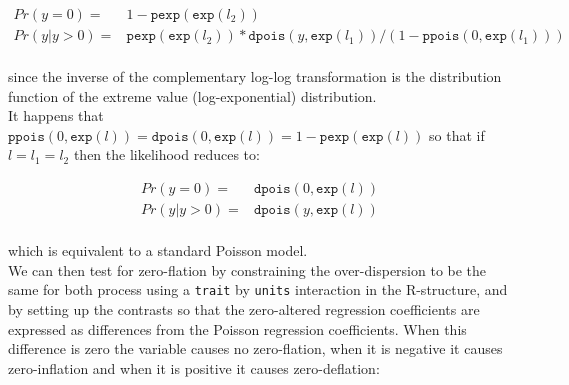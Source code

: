 \documentclass{article}
\begin{document}
\begin{equation} 
\begin{array}{rl}
Pr(y=0) =& 1-\texttt{pexp}(\texttt{exp}(l_{2}))\\
Pr(y | y>0) =& \texttt{pexp}(\texttt{exp}(l_{2}))\ast \texttt{dpois}(y, \texttt{exp}(l_{1}))/(1-\texttt{ppois}(0, \texttt{exp}(l_{1})))\\
\end{array}
\end{equation}

since the inverse of the complementary log-log transformation is the distribution function of the extreme value (log-exponential) distribution.\\

It happens that $\texttt{ppois}(0,\texttt{exp}(l)) = \texttt{dpois}(0,\texttt{exp}(l)) = 1-\texttt{pexp}(\texttt{exp}(l))$ so that if $l = l_{1} = l_{2}$ then the likelihood reduces to:

\begin{equation} 
\begin{array}{rl}
Pr(y=0) =& \texttt{dpois}(0,\texttt{exp}(l))\\
Pr(y | y>0) =& \texttt{dpois}(y, \texttt{exp}(l))\\
\end{array}
\end{equation}

which is equivalent to a standard Poisson model.\\

We can then test for zero-flation by constraining the over-dispersion to be the same for both process using a \texttt{trait} by \texttt{units} interaction in the R-structure, and by setting up the contrasts so that the zero-altered regression coefficients are expressed as differences from the Poisson regression coefficients. When this difference is zero the variable causes no zero-flation, when it is negative it causes zero-inflation and when it is positive it causes zero-deflation:
  
\end{document}
